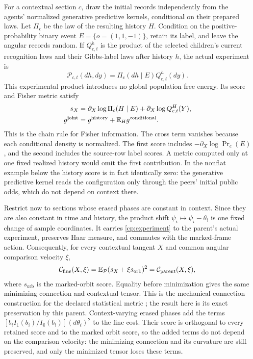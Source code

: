 For a contextual section $c$, draw the initial records independently from the agents' normalized generative predictive kernels, conditional on their prepared laws. Let $\Pi_c$ be the law of the resulting history $H$. Condition on the positive-probability binary event $E=\{o=(1,1,-1)\}$, retain its label, and leave the angular records random. If $Q_{c,t}^{h}$ is the product of the selected children's current recognition laws and their Gibbs-label laws after history $h$, the actual experiment is
\begin{equation}
 \mathcal P_{c,t}(dh,dy)=\Pi_c(dh\mid E)Q_{c,t}^{h}(dy).
 \label{cp:experiment}
\end{equation}
This experimental product introduces no global population free energy. Its score and Fisher metric satisfy
\begin{equation}
 \begin{aligned}
 s_X&=\partial_X\log\Pi_c(H\mid E)+\partial_X\log Q_{c,t}^{H}(Y),\\
 g^{\mathrm{joint}}&=g^{\mathrm{history}}+\mathbb E_H g^{\mathrm{conditional}}.
 \end{aligned}
 \label{cp:history-fisher}
\end{equation}
This is the chain rule for Fisher information. The cross term vanishes because each conditional density is normalized. The first score includes $-\partial_X\log\Pr_c(E)$, and the second includes the source-row label scores. A metric computed only at one fixed realized history would omit the first contribution. In the nonflat example below the history score is in fact identically zero: the generative predictive kernel reads the configuration only through the peers' initial public odds, which do not depend on context there.

Restrict now to sections whose erased phases are constant in context. Since they are also constant in time and history, the product shift $\psi_i\mapsto\psi_i-\theta_i$ is one fixed change of sample coordinates. It carries \cref{cp:experiment} to the parent's actual experiment, preserves Haar measure, and commutes with the marked-frame action. Consequently, for every contextual tangent $X$ and common angular comparison velocity $\xi$,
\begin{equation}
 \mathcal C_{\mathrm{fine}}(X,\xi)
 =\mathbb E_{\mathcal P}(s_X+\xi s_{\mathrm{orb}})^2
 =\mathcal C_{\mathrm{parent}}(X,\xi),
 \label{cp:cost-isometry}
\end{equation}
where $s_{\mathrm{orb}}$ is the marked-orbit score. Equality before minimization gives the same minimizing connection and contextual tensor. This is the mechanical-connection construction for the declared statistical metric \citep{Smale1970}; the result here is its exact preservation by this parent. Context-varying erased phases add the terms $[b_iI_1(b_i)/I_0(b_i)](d\theta_i)^2$ to the fine cost. Their score is orthogonal to every retained score and to the marked orbit score, so the added terms do not depend on the comparison velocity: the minimizing connection and its curvature are still preserved, and only the minimized tensor loses these terms.

